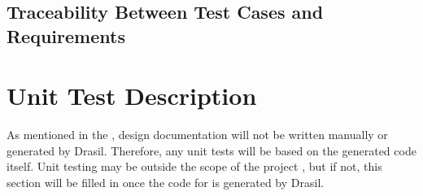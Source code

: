 \documentclass[12pt, titlepage]{article}
\begin{document}
\subsection{Traceability Between Test Cases and Requirements}


\section{Unit Test Description} \label{sec_unit_tests}

As mentioned in the , design documentation will not be
written manually or generated by Drasil. Therefore, any unit tests will be
based on the generated code itself. Unit testing may be outside the scope of
the \progname{} project , but if not, this section will be
filled in once the code for \progname{} is generated by Drasil.






\end{document}
